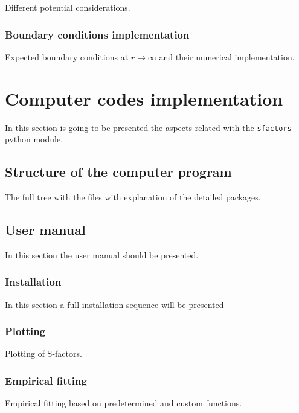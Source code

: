 \documentclass[openany]{book}
\begin{document}
Different potential considerations. 

\subsection{Boundary conditions implementation} \label{sub:diffSolvingBoundaries}

Expected boundary conditions at $r \rightarrow \infty$ and their numerical implementation.

\chapter{Computer codes implementation} \label{ap:codes}

In this section is going to be presented the aspects related with the \texttt{sfactors} python module. 

\section{Structure of the computer program} \label{sec:programStructure}

The full tree with the files with explanation of the detailed packages.

\section{User manual} \label{sec:userManual}

In this section the user manual should be presented.

\subsection{Installation} \label{sub:codesInstallation}

In this section a full installation sequence will be presented

\subsection{Plotting}  \label{sub:codesPlotting}

Plotting of S-factors. 

\subsection{Empirical fitting} \label{sub:codesEmpiricalFitting}

Empirical fitting based on predetermined and custom functions.
\end{document}
